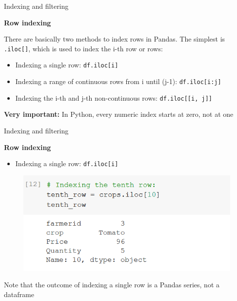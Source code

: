 \documentclass[aspectratio=169]{beamer}
\begin{document}
\begin{frame}{Indexing and filtering}

	\textbf{Row indexing}

	There are basically two methods to index rows in Pandas. The simplest is \texttt{.iloc[]}, which is used to index the i-th row or rows:

	\begin{itemize}
		\item Indexing a single row: \texttt{df.iloc[i]}
		\item Indexing a range of continuous rows from i until (j-1): \texttt{df.iloc[i:j]}
		\item Indexing the i-th and j-th non-continuous rows: \texttt{df.iloc[[i, j]]}
	\end{itemize}

	\textbf{Very important:} In Python, every numeric index starts at zero, not at one

\end{frame}

\begin{frame}{Indexing and filtering}

	\textbf{Row indexing}

	\begin{itemize}
		\item Indexing a single row: \texttt{df.iloc[i]}
	\end{itemize}

	\begin{figure}
		\centering
		\includegraphics[width=0.6\linewidth]{img/single_row.png}
	\end{figure}

	Note that the outcome of indexing a single row is a Pandas series, not a dataframe

\end{frame}
\end{document}
